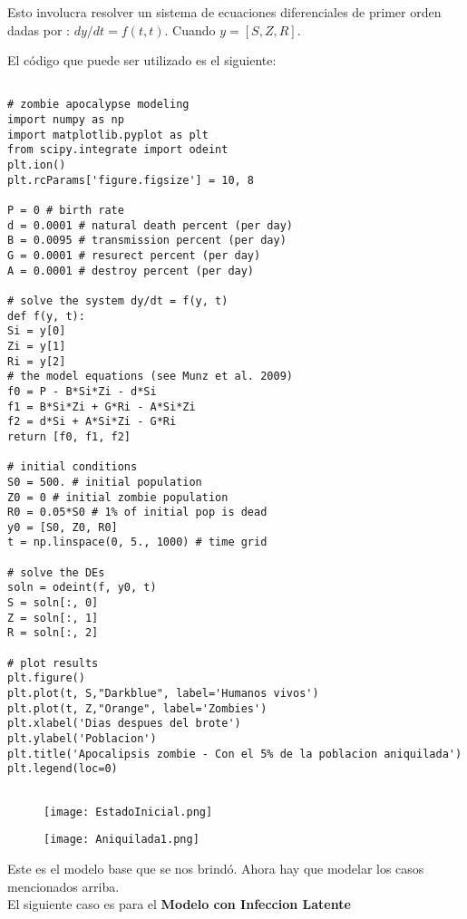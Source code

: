 \documentclass[a4 paper]{article}
\numberwithin{equation}{section}
\newcommand{\0}{\mathbf{0}}
\begin{document}
Esto involucra resolver un sistema de ecuaciones diferenciales de primer orden dadas por : $dy/dt = f(t,t)$. Cuando $y=[S,Z,R]$.

El código que puede ser utilizado es el siguiente:

\begin{verbatim}

# zombie apocalypse modeling
import numpy as np
import matplotlib.pyplot as plt
from scipy.integrate import odeint
plt.ion()
plt.rcParams['figure.figsize'] = 10, 8

P = 0 # birth rate
d = 0.0001 # natural death percent (per day)
B = 0.0095 # transmission percent (per day)
G = 0.0001 # resurect percent (per day)
A = 0.0001 # destroy percent (per day)

# solve the system dy/dt = f(y, t)
def f(y, t):
Si = y[0]
Zi = y[1]
Ri = y[2]
# the model equations (see Munz et al. 2009)
f0 = P - B*Si*Zi - d*Si
f1 = B*Si*Zi + G*Ri - A*Si*Zi
f2 = d*Si + A*Si*Zi - G*Ri
return [f0, f1, f2]

# initial conditions
S0 = 500. # initial population
Z0 = 0 # initial zombie population
R0 = 0.05*S0 # 1% of initial pop is dead
y0 = [S0, Z0, R0]
t = np.linspace(0, 5., 1000) # time grid

# solve the DEs
soln = odeint(f, y0, t)
S = soln[:, 0]
Z = soln[:, 1]
R = soln[:, 2]

# plot results
plt.figure()
plt.plot(t, S,"Darkblue", label='Humanos vivos')
plt.plot(t, Z,"Orange", label='Zombies')
plt.xlabel('Dias despues del brote')
plt.ylabel('Poblacion')
plt.title('Apocalipsis zombie - Con el 5% de la poblacion aniquilada')
plt.legend(loc=0)


\end{verbatim}

\begin{figure}[!ht]
  \centering
      \texttt{[image: EstadoInicial.png]}
  \caption{}
\end{figure}

\begin{figure}[!ht]
  \centering
      \texttt{[image: Aniquilada1.png]}
  \caption{}
\end{figure}


Este es el modelo base que se nos brind\'o. Ahora hay que modelar los casos mencionados arriba.\\

El siguiente caso es para el {\bf Modelo con Infeccion Latente}\\
\end{document}
